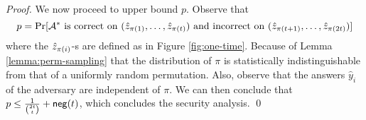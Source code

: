\begin{proof}
We now proceed to upper bound $p$. Observe that 
\[ 
p = \Pr[\mathcal{A}^* \text{ is correct on } (\hat{z}_{\pi(1)},\dots,\hat{z}_{\pi(t)}) \text{ and incorrect on } (\hat{z}_{\pi(t+1)},\dots,\hat{z}_{\pi(2t)})] 
\]
where the $\hat{z}_{\pi(i)}$-s are defined as in Figure \ref{fig:one-time}.
Because of Lemma \ref{lemma:perm-sampling} that the distribution of $\pi$ is statistically indistinguishable from that of a uniformly random permutation. Also, observe that the answers $\hat{y}_i$ of the adversary are independent of $\pi$.
We can then conclude that $p \leq \frac{1}{\binom{2t} {t}} + \mathsf{neg}(t)$, which concludes the security analysis. \qed



\end{proof}